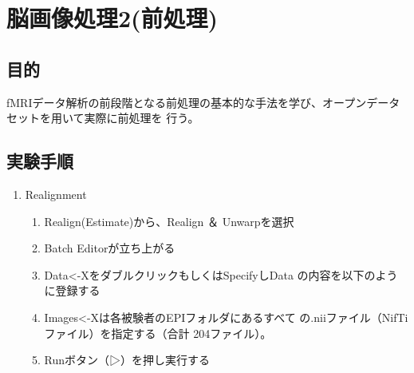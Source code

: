 \documentclass{jlreq}
\begin{document}
\section{脳画像処理2(前処理)}
\subsection{目的}
fMRIデータ解析の前段階となる前処理の基本的な手法を学び、オープンデータセットを用いて実際に前処理を
行う。
\subsection{実験手順}
\begin{enumerate}
    \item Realignment
    \begin{enumerate}
        \item Realign(Estimate)から、Realign ＆ Unwarpを選択
        \item Batch Editorが立ち上がる
        \item Data<-XをダブルクリックもしくはSpecifyしData
の内容を以下のように登録する 
        \item Images<-Xは各被験者のEPIフォルダにあるすべて
の.niiファイル（NifTiファイル）を指定する（合計
204ファイル）。
        \item Runボタン（▷）を押し実行する 
    \end{enumerate}


\end{enumerate}
\end{document}
